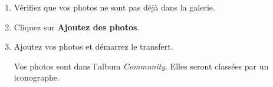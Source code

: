 \documentclass[12pt,nofoldmark,notumble]{leaflet}
\begin{document}
\begin{enumerate}[itemsep=0mm,leftmargin=*]

\item Vérifiez que vos photos ne sont pas déjà dans la galerie.
\item Cliquez sur \textbf{Ajoutez des photos}.
  \end{enumerate}
\begin{center}
\setlength{\fboxsep}{0pt}%
\setlength{\fboxrule}{0pt}%
%
\end{center}
  \begin{enumerate}
  \setcounter{enumi}{2}
\item Ajoutez vos photos et démarrez le transfert.

  Vos photos sont dans l'album \emph{Community}. Elles seront classées par un iconographe.
  
\end{enumerate}

  \vspace*{\fill}
\end{document}
